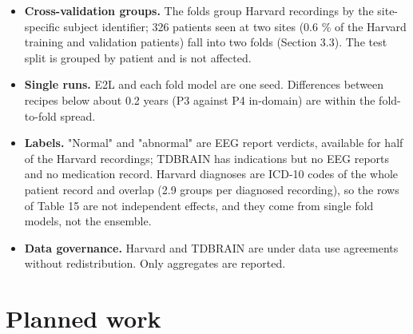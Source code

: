\documentclass[11pt,a4paper]{article}
\begin{document}
\begin{itemize}
\item \textbf{Cross-validation groups.} The folds group Harvard recordings by the site-specific subject identifier; 326 patients seen at two sites (0.6 \% of the Harvard training and validation patients) fall into two folds (Section 3.3). The test split is grouped by patient and is not affected.
\item \textbf{Single runs.} E2L and each fold model are one seed. Differences between recipes below about 0.2 years (P3 against P4 in-domain) are within the fold-to-fold spread.
\item \textbf{Labels.} "Normal" and "abnormal" are EEG report verdicts, available for half of the Harvard recordings; TDBRAIN has indications but no EEG reports and no medication record. Harvard diagnoses are ICD-10 codes of the whole patient record and overlap (2.9 groups per diagnosed recording), so the rows of Table 15 are not independent effects, and they come from single fold models, not the ensemble.
\item \textbf{Data governance.} Harvard and TDBRAIN are under data use agreements without redistribution. Only aggregates are reported.
\end{itemize}

\section{Planned work}
\end{document}
